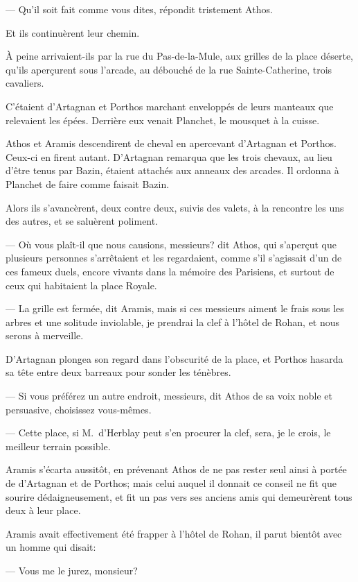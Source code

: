 — Qu'il soit fait comme vous dites, répondit tristement Athos.

Et ils continuèrent leur chemin.

À peine arrivaient-ils par la rue du Pas-de-la-Mule, aux grilles de la place déserte, qu'ils aperçurent sous l'arcade, au débouché de la rue Sainte-Catherine, trois cavaliers.

C'étaient d'Artagnan et Porthos marchant enveloppés de leurs manteaux que relevaient les épées. Derrière eux venait Planchet, le mousquet à la cuisse.

Athos et Aramis descendirent de cheval en apercevant d'Artagnan et Porthos.
Ceux-ci en firent autant. D'Artagnan remarqua que les trois chevaux, au lieu d'être tenus par Bazin, étaient attachés aux anneaux des arcades. Il ordonna à Planchet de faire comme faisait Bazin.

Alors ils s'avancèrent, deux contre deux, suivis des valets, à la rencontre les uns des autres, et se saluèrent poliment.

— Où vous plaît-il que nous causions, messieurs? dit Athos, qui s'aperçut que plusieurs personnes s'arrêtaient et les regardaient, comme s'il s'agissait d'un de ces fameux duels, encore vivants dans la mémoire des Parisiens, et surtout de ceux qui habitaient la place Royale.

— La grille est fermée, dit Aramis, mais si ces messieurs aiment le frais sous les arbres et une solitude inviolable, je prendrai la clef à l'hôtel de Rohan, et nous serons à merveille.

D'Artagnan plongea son regard dans l'obscurité de la place, et Porthos hasarda sa tête entre deux barreaux pour sonder les ténèbres.

— Si vous préférez un autre endroit, messieurs, dit Athos de sa voix noble et persuasive, choisissez vous-mêmes.

— Cette place, si M.~d'Herblay peut s'en procurer la clef, sera, je le crois, le meilleur terrain possible.

Aramis s'écarta aussitôt, en prévenant Athos de ne pas rester seul ainsi à portée de d'Artagnan et de Porthos; mais celui auquel il donnait ce conseil ne fit que sourire dédaigneusement, et fit un pas vers ses anciens amis qui demeurèrent tous deux à leur place.

Aramis avait effectivement été frapper à l'hôtel de Rohan, il parut bientôt avec un homme qui disait:

— Vous me le jurez, monsieur?

